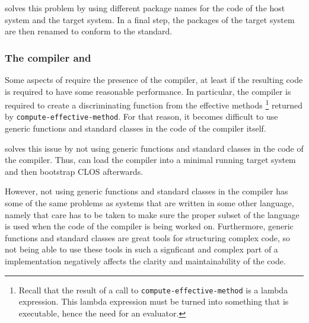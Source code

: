 \sbcl{} solves this problem by using different package names for the
code of the host system and the target system.  In a final step, the
packages of the target system are then renamed to conform to the
standard.

\subsubsection{The compiler and \clos{}}

Some aspects of \clos{} require the presence of the compiler, at least
if the resulting code is required to have some reasonable
performance.  In particular, the compiler is required to create a
discriminating function from the effective methods%
\footnote{Recall that the result of a call to
  \texttt{compute-effective-method} is a lambda expression.  This
  lambda expression must be turned into something that is executable,
  hence the need for an evaluator.}
returned by \texttt{compute-effective-method}.
For that reason, it becomes difficult to use generic
functions and standard classes in the code of the compiler itself.

\sbcl{} solves this issue by not using generic functions and standard
classes in the code of the compiler.  Thus, \sbcl{} can load the
compiler into a minimal running target system and then bootstrap CLOS
afterwards.

However, not using generic functions and standard classes in the
compiler has some of the same problems as \commonlisp{} systems that
are written in some other language, namely that care has to be taken
to make sure the proper subset of the language is used when the code
of the compiler is being worked on.  Furthermore, generic functions
and standard classes are great tools for structuring complex code, so
not being able to use these tools in such a signficant and complex
part of a \commonlisp{} implementation negatively affects the clarity
and maintainability of the code.
